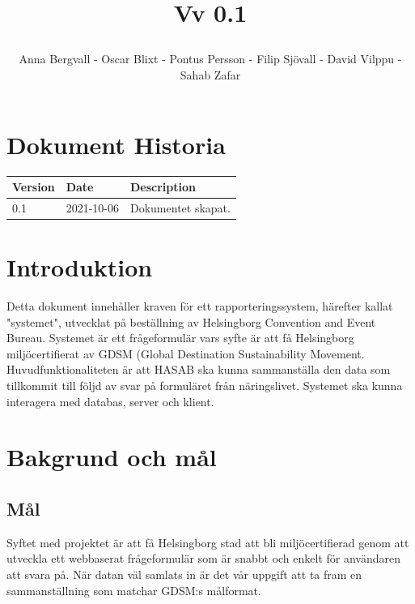 \documentclass{article}
\date {#1}
\title {
    \documentNumber {01}    

    \documentTitle {Helsingborg Event and Convention Bureau}
    
    \documentDate {2021-08-20}
    \documentVersion Vv 0.1
    
    \author{Anna Bergvall - Oscar Blixt - Pontus Persson - Filip Sjövall - David Vilppu - Sahab Zafar}
}
\begin{document}
\maketitle

\thispagestyle{empty}



\newpage

\tableofcontents


\newpage

\section{Dokument Historia}
\begin{tabular}{ l | l | l }
    Version & Date & Description \\
    \hline
    0.1 & 2021-10-06 & Dokumentet skapat. \\
    
\end{tabular}

\section{Introduktion}
    Detta dokument innehåller kraven för ett rapporteringssystem, härefter kallat "systemet", utvecklat på beställning av Helsingborg Convention and Event Bureau. Systemet är ett frågeformulär vars syfte är att få Helsingborg miljöcertifierat av GDSM (Global Destination Sustainability Movement. Huvudfunktionaliteten är att HASAB ska kunna sammanställa den data som tillkommit till följd av svar på formuläret från näringslivet. Systemet ska kunna interagera med databas, server och klient.
    

\section{Bakgrund och mål}

    \subsection{Mål}
       Syftet med projektet är att få Helsingborg stad att bli miljöcertifierad genom att utveckla ett webbaserat frågeformulär som är snabbt och enkelt för användaren att svara på. När datan väl samlats in är det vår uppgift att ta fram en sammanställning som matchar GDSM:s målformat.
        
\end{document}
